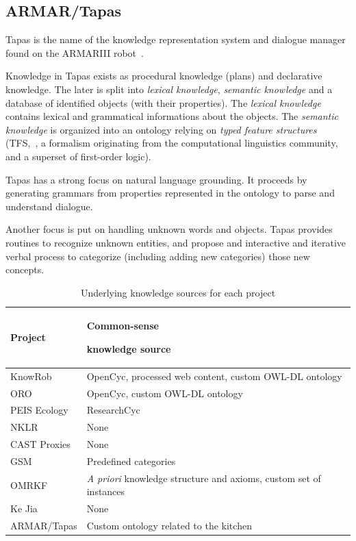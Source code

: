 \documentclass[a4paper, twocolumn]{article}
\begin{document}
\subsection{ARMAR/Tapas}

{\sc Tapas} is the name of the knowledge representation system and dialogue
manager found on the ARMARIII robot~\cite{Holzapfel2008}.

Knowledge in {\sc Tapas} exists as procedural knowledge (plans) and declarative
knowledge. The later is split into \emph{lexical knowledge}, \emph{semantic
knowledge} and a database of identified objects (with their properties). The
\emph{lexical knowledge} contains lexical and grammatical informations about
the objects. The \emph{semantic knowledge} is organized into an ontology
relying on \emph{typed feature structures} (TFS,~\cite{Carpenter1992}, a
formalism originating from the computational linguistics community, and a
superset of first-order logic).

{\sc Tapas} has a strong focus on natural language grounding. It proceeds by
generating grammars from properties represented in the ontology to parse and
understand dialogue.

Another focus is put on handling unknown words and objects. {\sc Tapas}
provides routines to recognize unknown entities, and propose and interactive
and iterative verbal process to categorize (including adding new categories)
those new concepts.

\begin{table}
\begin{center}

\begin{tabular}{lp{4cm}}
\toprule
{\bf Project} & {\bf Common-sense \par knowledge source} \\
\midrule
{\sc KnowRob} & {\sc OpenCyc}, processed web content, custom OWL-DL ontology \\
ORO & {\sc OpenCyc}, custom OWL-DL ontology \\
PEIS Ecology & {\sc ResearchCyc} \\
NKLR &  None \\
CAST Proxies &  None \\
GSM &  Predefined categories \\
OMRKF & {\it A priori} knowledge structure and axioms, custom set of instances\\
Ke Jia & None \\
ARMAR/{\sc Tapas} & Custom ontology related to the kitchen\\

\bottomrule

\end{tabular}
\end{center}
\caption{Underlying knowledge sources for each project}
\label{table|knowledge-sources}
\end{table}
\end{document}
